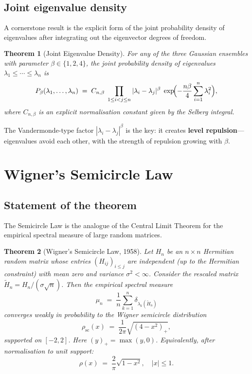 \documentclass[12pt,a4paper]{amsart}
\newtheorem{theorem}{Theorem}[section]
\theoremstyle{definition}
\theoremstyle{remark}
\begin{document}
\subsection{Joint eigenvalue density}

A cornerstone result is the explicit form of the joint probability density
of eigenvalues after integrating out the eigenvector degrees of freedom.

\begin{theorem}[Joint Eigenvalue Density]
\label{thm:jpdf}
For any of the three Gaussian ensembles with parameter $\beta \in \{1,2,4\}$,
the joint probability density of eigenvalues $\lambda_1 \leq \cdots \leq \lambda_n$
is
\[
  P_\beta(\lambda_1,\ldots,\lambda_n)
  \;=\; C_{n,\beta}\;
  \prod_{1 \leq i < j \leq n} |\lambda_i - \lambda_j|^\beta\;
  \exp\!\Bigl(-\frac{n\beta}{4}\sum_{i=1}^n \lambda_i^2\Bigr),
\]
where $C_{n,\beta}$ is an explicit normalisation constant given by the
Selberg integral.
\end{theorem}

The Vandermonde-type factor $|\lambda_i - \lambda_j|^\beta$ is the key:
it creates \textbf{level repulsion}---eigenvalues avoid each other, with
the strength of repulsion growing with $\beta$.

\section{Wigner's Semicircle Law}
\label{sec:semicircle}

\subsection{Statement of the theorem}

The Semicircle Law is the analogue of the Central Limit Theorem for the
empirical spectral measure of large random matrices.

\begin{theorem}[Wigner's Semicircle Law, 1958]
\label{thm:semicircle}
Let $H_n$ be an $n \times n$ Hermitian random matrix whose entries
$(H_{ij})_{i \leq j}$ are independent (up to the Hermitian constraint)
with mean zero and variance $\sigma^2 < \infty$. Consider the rescaled
matrix $\tilde{H}_n = H_n / (\sigma\sqrt{n})$. Then the empirical spectral
measure
\[
  \mu_n \;=\; \frac{1}{n}\sum_{k=1}^n \delta_{\lambda_k(\tilde{H}_n)}
\]
converges weakly in probability to the Wigner semicircle distribution
\[
  \rho_{\mathrm{sc}}(x) \;=\; \frac{1}{2\pi}\sqrt{(4-x^2)_+},
\]
supported on $[-2,2]$. Here $(y)_+ = \max(y,0)$.
Equivalently, after normalisation to unit support:
\[
  \rho(x) \;=\; \frac{2}{\pi}\sqrt{1-x^2}, \quad |x| \leq 1.
\]
\end{theorem}
\end{document}
